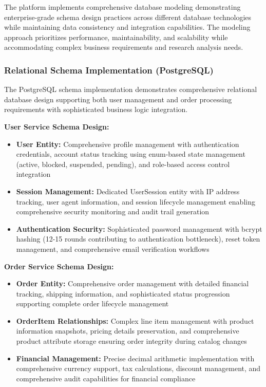 The platform implements comprehensive database modeling demonstrating enterprise-grade schema design practices across different database technologies while maintaining data consistency and integration capabilities. The modeling approach prioritizes performance, maintainability, and scalability while accommodating complex business requirements and research analysis needs.

\subsubsection{Relational Schema Implementation (PostgreSQL)}

The PostgreSQL schema implementation demonstrates comprehensive relational database design supporting both user management and order processing requirements with sophisticated business logic integration.

\textbf{User Service Schema Design:}
\begin{itemize}
\item \textbf{User Entity:} Comprehensive profile management with authentication credentials, account status tracking using enum-based state management (active, blocked, suspended, pending), and role-based access control integration
\item \textbf{Session Management:} Dedicated UserSession entity with IP address tracking, user agent information, and session lifecycle management enabling comprehensive security monitoring and audit trail generation
\item \textbf{Authentication Security:} Sophisticated password management with bcrypt hashing (12-15 rounds contributing to authentication bottleneck), reset token management, and comprehensive email verification workflows
\end{itemize}

\textbf{Order Service Schema Design:}
\begin{itemize}
\item \textbf{Order Entity:} Comprehensive order management with detailed financial tracking, shipping information, and sophisticated status progression supporting complete order lifecycle management
\item \textbf{OrderItem Relationships:} Complex line item management with product information snapshots, pricing details preservation, and comprehensive product attribute storage ensuring order integrity during catalog changes
\item \textbf{Financial Management:} Precise decimal arithmetic implementation with comprehensive currency support, tax calculations, discount management, and comprehensive audit capabilities for financial compliance
\end{itemize}

